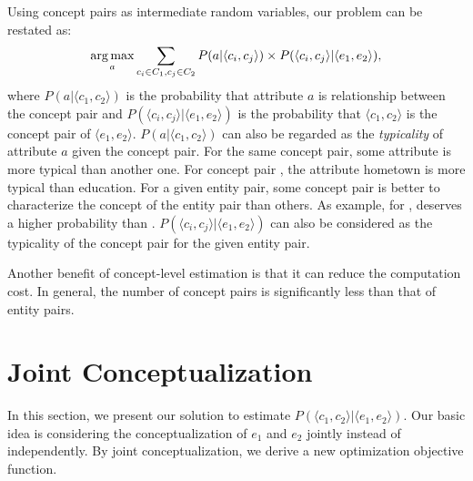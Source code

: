 Using concept pairs as intermediate random variables, our problem can be restated as:
\begin{equation}
\label{eq:target}
\operatorname*{arg\,max}_a \sum_{c_i\in C_1 , c_j \in C_2 }P(a|\langle c_{i},c_{j}\rangle)\times P(\langle c_{i},c_{j}\rangle|\langle e_{1},e_{2}\rangle),
\end{equation}
where $P(a|\langle c_{1},c_{2}\rangle)$ is the probability that attribute $a$ is relationship between the concept pair
and $P(\langle c_{i},c_{j}\rangle |\langle e_{1},e_{2}\rangle)$ is the probability that $\langle c_1, c_2\rangle$ is the concept pair of $ \langle e_1, e_2 \rangle $.
$P(a| \langle c_{1},c_{2} \rangle )$ can also be regarded as the {\it typicality} of attribute $a$ given the concept pair.
For the same concept pair, some attribute is more typical than another one.
For concept pair , the attribute \ac{hometown} is more typical than \ac{education}.
For a given entity pair, some concept pair is better to characterize the concept of the entity pair than others.
As example,  for ,   deserves a higher probability than .
$P( \langle c_{i},c_{j} \rangle | \langle e_{1},e_{2} \rangle )$ can also be considered as the typicality of the concept pair for the given entity pair.


Another benefit of concept-level estimation is that it can reduce the computation cost.
In general, the number of concept pairs is significantly less than that of entity pairs.

\section{Joint Conceptualization}
In this section, we present our solution to estimate $ P(\langle c_1,c_2 \rangle | \langle e_1,e_2\rangle) $.
Our basic idea is considering the conceptualization of $e_1$ and $e_2$ jointly instead of independently.
By joint conceptualization, we derive a new optimization objective function.


